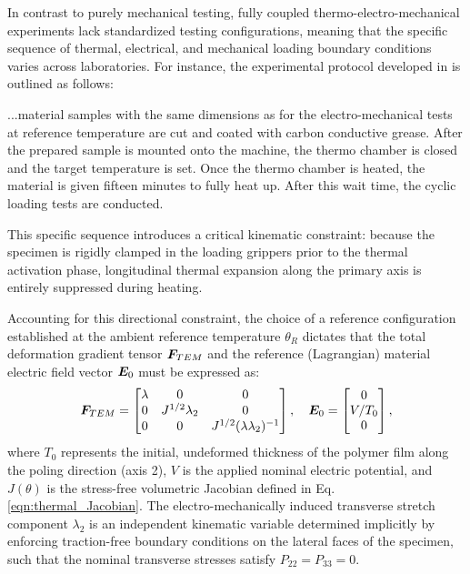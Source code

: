 In contrast to purely mechanical testing, fully coupled thermo-electro-mechanical experiments lack standardized testing configurations, meaning that the specific sequence of thermal, electrical, and mechanical loading boundary conditions varies across laboratories. For instance, the experimental protocol developed in \cite{Mehnert2021a} is outlined as follows:
%
\begin{displayquote}
  ...material samples with the same dimensions as for the electro-mechanical tests at reference temperature are cut and coated with carbon conductive grease. After the prepared sample is mounted onto the machine, the thermo chamber is closed and the target temperature is set. Once the thermo chamber is heated, the material is given fifteen minutes to fully heat up. After this wait time, the cyclic loading tests are conducted.
\end{displayquote}
%
This specific sequence introduces a critical kinematic constraint: because the specimen is rigidly clamped in the loading grippers prior to the thermal activation phase, longitudinal thermal expansion along the primary axis is entirely suppressed during heating. 

Accounting for this directional constraint, the choice of a reference configuration established at the ambient reference temperature $\theta_R$ dictates that the total deformation gradient tensor $\boldsymbol{F}_{TEM}$ and the reference (Lagrangian) material electric field vector $\boldsymbol{E}_0$ must be expressed as:
%
\begin{equation}
  \label{eqn:F_thermo_electro_mech}
  \boldsymbol{F}_{TEM} = \begin{bmatrix}
    \lambda & 0 & 0 \\
    0 & J^{1/2}\lambda_2 & 0 \\
    0 & 0 & J^{1/2}(\lambda\lambda_2)^{-1}
  \end{bmatrix} , \quad
  \boldsymbol{E}_0 = \begin{bmatrix} 0 \\ V/T_0 \\ 0 \end{bmatrix},
\end{equation}
%
where $T_0$ represents the initial, undeformed thickness of the polymer film along the poling direction (axis 2), $V$ is the applied nominal electric potential, and $J(\theta)$ is the stress-free volumetric Jacobian defined in Eq. \eqref{eqn:thermal_Jacobian}. The electro-mechanically induced transverse stretch component $\lambda_2$ is an independent kinematic variable determined implicitly by enforcing traction-free boundary conditions on the lateral faces of the specimen, such that the nominal transverse stresses satisfy $P_{22} = P_{33} = 0$. 

